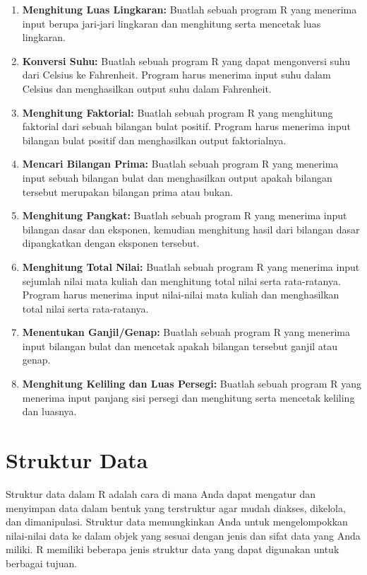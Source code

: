 \documentclass[
]{book}
\providecommand{\tightlist}{%
  \setlength{\itemsep}{0pt}\setlength{\parskip}{0pt}}
\begin{document}
\begin{enumerate}
\def\labelenumi{\arabic{enumi}.}
\tightlist
\item
  \textbf{Menghitung Luas Lingkaran:} Buatlah sebuah program R yang menerima input berupa jari-jari lingkaran dan menghitung serta mencetak luas lingkaran.
\item
  \textbf{Konversi Suhu:} Buatlah sebuah program R yang dapat mengonversi suhu dari Celsius ke Fahrenheit. Program harus menerima input suhu dalam Celsius dan menghasilkan output suhu dalam Fahrenheit.
\item
  \textbf{Menghitung Faktorial:} Buatlah sebuah program R yang menghitung faktorial dari sebuah bilangan bulat positif. Program harus menerima input bilangan bulat positif dan menghasilkan output faktorialnya.
\item
  \textbf{Mencari Bilangan Prima:} Buatlah sebuah program R yang menerima input sebuah bilangan bulat dan menghasilkan output apakah bilangan tersebut merupakan bilangan prima atau bukan.
\item
  \textbf{Menghitung Pangkat:} Buatlah sebuah program R yang menerima input bilangan dasar dan eksponen, kemudian menghitung hasil dari bilangan dasar dipangkatkan dengan eksponen tersebut.
\item
  \textbf{Menghitung Total Nilai:} Buatlah sebuah program R yang menerima input sejumlah nilai mata kuliah dan menghitung total nilai serta rata-ratanya. Program harus menerima input nilai-nilai mata kuliah dan menghasilkan total nilai serta rata-ratanya.
\item
  \textbf{Menentukan Ganjil/Genap:} Buatlah sebuah program R yang menerima input bilangan bulat dan mencetak apakah bilangan tersebut ganjil atau genap.
\item
  \textbf{Menghitung Keliling dan Luas Persegi:} Buatlah sebuah program R yang menerima input panjang sisi persegi dan menghitung serta mencetak keliling dan luasnya.
\end{enumerate}

\hypertarget{struktur-data}{%
\chapter{Struktur Data}\label{struktur-data}}

Struktur data dalam R adalah cara di mana Anda dapat mengatur dan menyimpan data dalam bentuk yang terstruktur agar mudah diakses, dikelola, dan dimanipulasi. Struktur data memungkinkan Anda untuk mengelompokkan nilai-nilai data ke dalam objek yang sesuai dengan jenis dan sifat data yang Anda miliki. R memiliki beberapa jenis struktur data yang dapat digunakan untuk berbagai tujuan.
\end{document}
